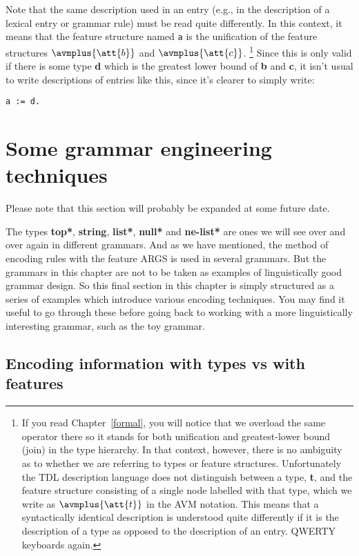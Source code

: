 \documentclass[12pt]{report}
\begin{document}
Note that the same description used in an entry (e.g., in the 
description of a lexical entry or grammar rule) must be read quite
differently.  In this context, it
means that the feature structure named {\tt a} is the unification of
the feature structures {\tiny $\avmplus{\att{b}}$} and {\tiny $\avmplus{\att{c}}$}.
\footnote{If you read Chapter~\ref{formal},
you will notice that we overload the same operator there
so it stands for both unification and greatest-lower bound
(join) in the type
hierarchy.  In that context, however, there is no ambiguity
as to whether we are referring to types or feature
structures.  Unfortunately the TDL description language 
does not distinguish between a type, {\bf t}, and the feature structure 
consisting of a single node labelled with that type, which we write as
$\avmplus{\att{t}}$ in the AVM notation.  
This means that a syntactically
identical description is understood quite differently if it is the 
description of a type as opposed to the description of an entry.  
QWERTY keyboards
again.} 
Since this is only valid if there is some type {\bf d}
which is the greatest lower bound
of {\bf b} and {\bf c}, it isn't usual to write descriptions of entries like
this, since it's clearer to simply write:
\begin{verbatim}
a := d.
\end{verbatim}



\section{Some grammar engineering techniques}

Please note that this section will probably be expanded at some
future date.

The types {\bf *top*}, {\bf string}, {\bf *list*}, {\bf *null*}
and {\bf *ne-list*} are ones we will see over and over again
in different grammars.  And as we have
mentioned, the method of encoding rules
with the feature ARGS is used in several grammars.  
But the grammars in this chapter are not 
to be taken as examples of linguistically good grammar
design.  So this final section in this chapter is
simply structured as 
a series of examples which introduce various encoding
techniques.
You may find it useful to go through these before going back to
working with a more linguistically
interesting grammar, such as the toy grammar.

\subsection{Encoding information with types vs with features} 
\end{document}
